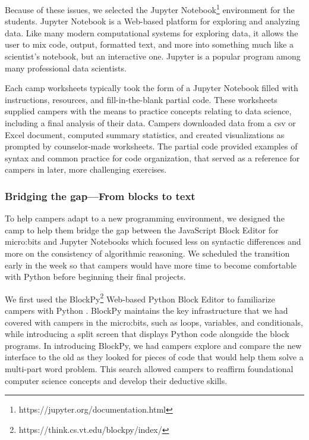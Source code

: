 Because of these issues, we selected the Jupyter
Notebook\footnote{https://jupyter.org/documentation.html} environment
for the students.
Jupyter Notebook is a Web-based platform for exploring and analyzing
data.  Like many modern computational systems for exploring data, it
allows the user to mix code, output, formatted text, and more into
something much like a scientist's notebook, but an interactive one.
Jupyter is a popular program among many professional data scientists.

Each camp worksheets typically took the form of a Jupyter Notebook
filled with instructions, resources, and fill-in-the-blank partial
code.  These worksheets supplied campers with the means to practice
concepts relating to data science, including a final analysis of
their data.  Campers downloaded data from a csv or Excel document,
computed summary statistics, and created visualizations as prompted
by counselor-made worksheets. The partial code provided examples
of syntax and common practice for code organization, that served
as a reference for campers in later, more challenging exercises.

\subsubsection{Bridging the gap---From blocks to text}

To help campers adapt to a new programming environment, we designed
the camp to help them bridge the gap between the JavaScript Block
Editor for micro:bits and Jupyter Notebooks which focused less on
syntactic differences and more on the consistency of algorithmic
reasoning.  We scheduled the transition early in the week so that
campers would have more time to become comfortable with Python
before beginning their final projects.

We first used the BlockPy\footnote{https://think.cs.vt.edu/blockpy/index/}
Web-based Python Block Editor to familiarize campers with Python
\cite{Bart2017}.  BlockPy maintains the key infrastructure that we
had covered with campers in the micro:bits, such as loops, variables,
and conditionals, while introducing a split screen that displays
Python code alongside the block programs. In introducing BlockPy,
we had campers explore and compare the new interface to the old as
they looked for pieces of code that would help them solve a multi-part
word problem. This search allowed campers to reaffirm foundational
computer science concepts and develop their deductive skills.

